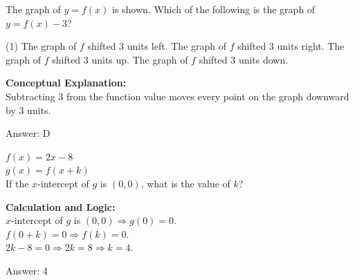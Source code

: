 \documentclass[11pt,paper=a4,answers]{exam}
\begin{document}
\begin{questions}
\question
\begin{center}
\end{center}
The graph of $y=f(x)$ is shown. Which of the following is the graph of $y=f(x)-3$?
\begin{tasks}(1)
    \task The graph of $f$ shifted 3 units left.
    \task The graph of $f$ shifted 3 units right.
    \task The graph of $f$ shifted 3 units up.
    \task The graph of $f$ shifted 3 units down.
\end{tasks}

\begin{solution}
\textbf{Conceptual Explanation:} \\
Subtracting 3 from the function value moves every point on the graph downward by 3 units.

\vspace{25pt}

Answer: \colorbox{yellow!100}{D}
\end{solution}

\vspace{40pt}

\question
$f(x) = 2x - 8$ \\
$g(x) = f(x+k)$ \\
If the $x$-intercept of $g$ is $(0, 0)$, what is the value of $k$?

\begin{solution}
\textbf{Calculation and Logic:} \\
$x$-intercept of $g$ is $(0,0) \Rightarrow g(0) = 0$. \\
$f(0+k) = 0 \Rightarrow f(k) = 0$. \\
$2k - 8 = 0 \Rightarrow 2k = 8 \Rightarrow k = 4$.

\vspace{25pt}

Answer: \colorbox{yellow!100}{4}
\end{solution}

\vspace{40pt}


\end{questions}
\end{document}
